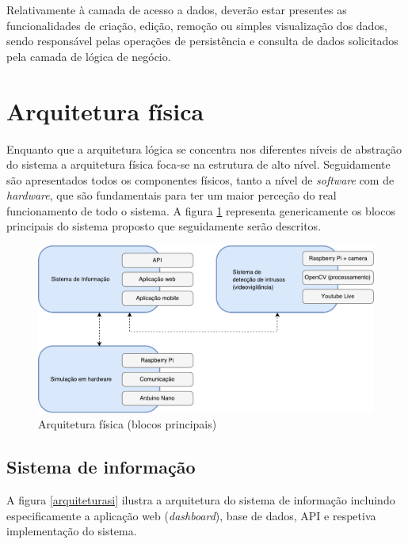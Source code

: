 Relativamente à camada de acesso a dados, deverão estar presentes as funcionalidades de criação, edição, remoção ou simples visualização dos dados, sendo responsável pelas operações de persistência e consulta de dados solicitados pela camada de lógica de negócio.


\section{Arquitetura física}


Enquanto que a arquitetura lógica se concentra nos diferentes níveis de abstração do sistema a arquitetura física foca-se na estrutura de alto nível.  
Seguidamente são apresentados todos os componentes físicos, tanto  a nível de \textit{software} com de \textit{hardware}, que são fundamentais para ter um maior perceção do real funcionamento de todo o sistema. 
A figura \ref{fisicablocos} representa genericamente os blocos principais do sistema proposto que seguidamente serão descritos. 


\begin{figure}[h]
	\centering
	\includegraphics[scale=0.51]{esquemas/esquema-blocos.pdf}
	\caption{Arquitetura física (blocos principais)}
	\label{fisicablocos}
\end{figure}


  
\subsection{Sistema de informação}




A figura \ref{arquiteturasi} ilustra a arquitetura do sistema de informação incluindo especificamente a aplicação web (\textit{dashboard}), base de dados, \acs{API}   e respetiva implementação do sistema. 





